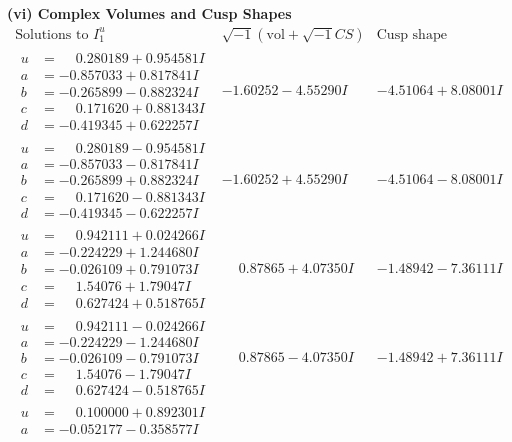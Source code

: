 \documentclass[1p]{elsarticle_modified}
\theoremstyle{definition}
\newcommand{\I}{\sqrt{-1}}
\begin{document}
\newpage\flushleft \textbf{(vi) Complex Volumes and Cusp Shapes}
$$\begin{array}{c|c|c}  
\text{Solutions to }I^u_{1}& \I (\text{vol} + \sqrt{-1}CS) & \text{Cusp shape}\\
 \hline 
\begin{aligned}
u &= \phantom{-}0.280189 + 0.954581 I \\
a &= -0.857033 + 0.817841 I \\
b &= -0.265899 - 0.882324 I \\
c &= \phantom{-}0.171620 + 0.881343 I \\
d &= -0.419345 + 0.622257 I\end{aligned}
 & -1.60252 - 4.55290 I & -4.51064 + 8.08001 I \\ \hline\begin{aligned}
u &= \phantom{-}0.280189 - 0.954581 I \\
a &= -0.857033 - 0.817841 I \\
b &= -0.265899 + 0.882324 I \\
c &= \phantom{-}0.171620 - 0.881343 I \\
d &= -0.419345 - 0.622257 I\end{aligned}
 & -1.60252 + 4.55290 I & -4.51064 - 8.08001 I \\ \hline\begin{aligned}
u &= \phantom{-}0.942111 + 0.024266 I \\
a &= -0.224229 + 1.244680 I \\
b &= -0.026109 + 0.791073 I \\
c &= \phantom{-}1.54076 + 1.79047 I \\
d &= \phantom{-}0.627424 + 0.518765 I\end{aligned}
 & \phantom{-}0.87865 + 4.07350 I & -1.48942 - 7.36111 I \\ \hline\begin{aligned}
u &= \phantom{-}0.942111 - 0.024266 I \\
a &= -0.224229 - 1.244680 I \\
b &= -0.026109 - 0.791073 I \\
c &= \phantom{-}1.54076 - 1.79047 I \\
d &= \phantom{-}0.627424 - 0.518765 I\end{aligned}
 & \phantom{-}0.87865 - 4.07350 I & -1.48942 + 7.36111 I \\ \hline\begin{aligned}
u &= \phantom{-}0.100000 + 0.892301 I \\
a &= -0.052177 - 0.358577 I \\

\end{aligned}
\end{array}$$
\end{document}
